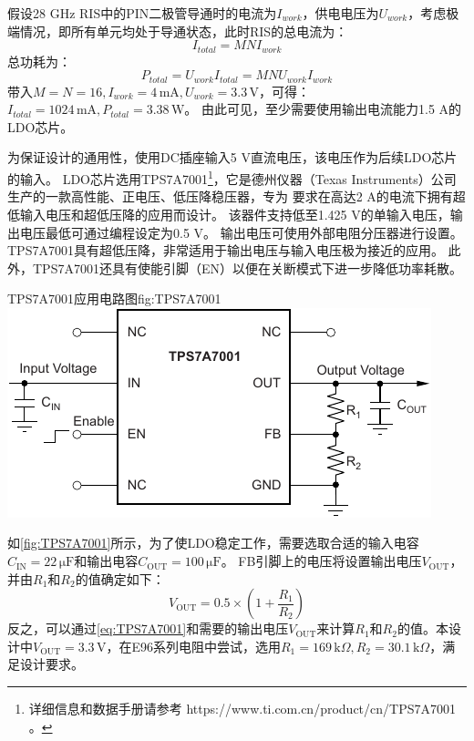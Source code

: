 \documentclass[supercite]{HustGraduPaper}
\begin{document}
假设28 GHz RIS中的PIN二极管导通时的电流为$I_{work}$，供电电压为$U_{work}$，考虑极端情况，即所有单元均处于导通状态，此时RIS的总电流为：
\begin{equation}
	I_{total}=MNI_{work}
\end{equation}
总功耗为：
\begin{equation}
	P_{total}=U_{work}I_{total}=MNU_{work}I_{work}
\end{equation}
带入$M=N=16,I_{work}=4\,\mathrm{mA}, U_{work}=3.3\, \mathrm{V}$，可得：$I_{total}=1024 \, \mathrm{mA},P_{total}=3.38\,\mathrm{W}$。
由此可见，至少需要使用输出电流能力1.5 A的LDO芯片。

为保证设计的通用性，使用DC插座输入5 V直流电压，该电压作为后续LDO芯片的输入。
LDO芯片选用TPS7A7001\footnote{详细信息和数据手册请参考 https://www.ti.com.cn/product/cn/TPS7A7001 。}，它是德州仪器（Texas Instruments）公司生产的一款高性能、正电压、低压降稳压器，专为 要求在高达2 A的电流下拥有超低输入电压和超低压降的应用而设计。
该器件支持低至1.425 V的单输入电压，输出电压最低可通过编程设定为0.5 V。
输出电压可使用外部电阻分压器进行设置。TPS7A7001具有超低压降，非常适用于输出电压与输入电压极为接近的应用。
此外，TPS7A7001还具有使能引脚（EN）以便在关断模式下进一步降低功率耗散。

\begin{generalfig}[htb]{TPS7A7001应用电路图}{fig:TPS7A7001}
	\includegraphics[width=0.6\linewidth]{Figures/TPS7A7001.pdf}
\end{generalfig}

如\autoref{fig:TPS7A7001}所示，为了使LDO稳定工作，需要选取合适的输入电容$C_\mathrm{IN}=22\,\mathrm{\mu F}$和输出电容$C_\mathrm{OUT}=100\,\mathrm{\mu F}$。
FB引脚上的电压将设置输出电压$V_\mathrm{OUT}$，并由$R_1$和$R_2$的值确定如下：
\begin{equation}
	V_\mathrm{OUT} = 0.5 \times \left(1+\frac{R_1}{R_2}\right)  
	\label{eq:TPS7A7001}
\end{equation}
反之，可以通过\autoref{eq:TPS7A7001}和需要的输出电压$V_\mathrm{OUT}$来计算$R_1$和$R_2$的值。本设计中$V_\mathrm{OUT} = 3.3 \, \mathrm{V}$，在E96系列电阻中尝试，选用$R_1=169\, \mathrm{k}\Omega , R_2=30.1\, \mathrm{k}\Omega $，满足设计要求。
\end{document}
